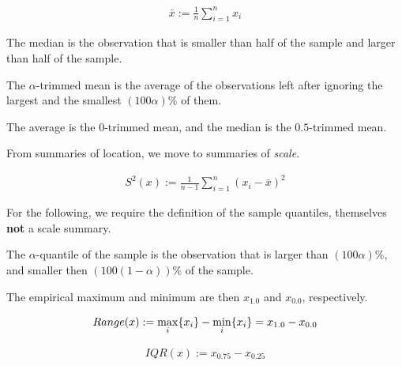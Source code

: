 \documentclass[12pt,a4paper]{report}
\begin{document}
\begin{definition}
\begin{align}
	\bar{x}:= \frac{1}{n}\sum_{i=1}^{n} x_i
\end{align}
\end{definition}

\begin{definition}
The median is the observation that is smaller than half of the sample and larger than half of the sample.
\end{definition}

\begin{definition}
The $\alpha$-trimmed mean is the average of the observations left after ignoring the largest and the smallest $(100\alpha) \%$ of them.
\end{definition}
The \naive average is the $0$-trimmed mean, and the median is the $0.5$-trimmed mean.

From summaries of location, we move to summaries of \emph{scale}. 

\begin{definition}
\begin{align}
	S^2(x):= \frac{1}{n-1} \sum_{i=1}^{n} (x_i-\bar{x})^2
\end{align}
\end{definition}

For the following, we require the definition of the sample quantiles, themselves \textbf{not} a scale summary.

\begin{definition}
The $\alpha$-quantile of the sample is the observation that is larger than $(100\alpha)\%$, and smaller then  $(100(1-\alpha))\%$ of the sample. 
\end{definition}
The empirical maximum and minimum are then $x_{1.0}$ and $x_{0.0}$, respectively.


\begin{definition}
\begin{align}
	Range(x):= \max_i\{ x_i \}-\min_i\{ x_i \}= x_{1.0}-x_{0.0}
\end{align}
\end{definition}

\begin{definition}
\begin{align}
	IQR(x):= x_{0.75}-x_{0.25}
\end{align}
\end{definition}
\end{document}
